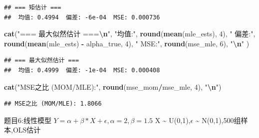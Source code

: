 \documentclass[
]{article}
\newenvironment{Shaded}{\begin{snugshade}}{\end{snugshade}}
\newcommand{\DecValTok}[1]{\textcolor[rgb]{0.00,0.00,0.81}{#1}}
\newcommand{\FunctionTok}[1]{\textcolor[rgb]{0.13,0.29,0.53}{\textbf{#1}}}
\newcommand{\NormalTok}[1]{#1}
\newcommand{\SpecialCharTok}[1]{\textcolor[rgb]{0.81,0.36,0.00}{\textbf{#1}}}
\newcommand{\StringTok}[1]{\textcolor[rgb]{0.31,0.60,0.02}{#1}}
\begin{document}
\begin{verbatim}
## === 矩估计 ===
##  均值: 0.4994  偏差: -6e-04  MSE: 0.000736
\end{verbatim}

\begin{Shaded}
\begin{Highlighting}[]
\FunctionTok{cat}\NormalTok{(}\StringTok{"=== 最大似然估计 ===}\SpecialCharTok{\textbackslash{}n}\StringTok{"}\NormalTok{,}
\StringTok{"均值:"}\NormalTok{, }\FunctionTok{round}\NormalTok{(}\FunctionTok{mean}\NormalTok{(mle\_ests), }\DecValTok{4}\NormalTok{),}
\StringTok{" 偏差:"}\NormalTok{, }\FunctionTok{round}\NormalTok{(}\FunctionTok{mean}\NormalTok{(mle\_ests) }\SpecialCharTok{{-}}\NormalTok{ alpha\_true, }\DecValTok{4}\NormalTok{),}
\StringTok{" MSE:"}\NormalTok{, }\FunctionTok{round}\NormalTok{(mse\_mle, }\DecValTok{6}\NormalTok{), }\StringTok{"}\SpecialCharTok{\textbackslash{}n}\StringTok{"}
\NormalTok{)}
\end{Highlighting}
\end{Shaded}

\begin{verbatim}
## === 最大似然估计 ===
##  均值: 0.4999  偏差: -1e-04  MSE: 0.000408
\end{verbatim}

\begin{Shaded}
\begin{Highlighting}[]
\FunctionTok{cat}\NormalTok{(}\StringTok{"MSE之比 (MOM/MLE):"}\NormalTok{, }\FunctionTok{round}\NormalTok{(mse\_mom}\SpecialCharTok{/}\NormalTok{mse\_mle, }\DecValTok{4}\NormalTok{), }\StringTok{"}\SpecialCharTok{\textbackslash{}n}\StringTok{"}\NormalTok{)}
\end{Highlighting}
\end{Shaded}

\begin{verbatim}
## MSE之比 (MOM/MLE): 1.8066
\end{verbatim}

题目6:线性模型 \(Y = \alpha + \beta*X + \epsilon,\alpha=2,\beta=1.5\) X
\textasciitilde{} U(0,1),\(\epsilon\) \textasciitilde{}
N(0,1),500组样本,OLS估计
\end{document}
